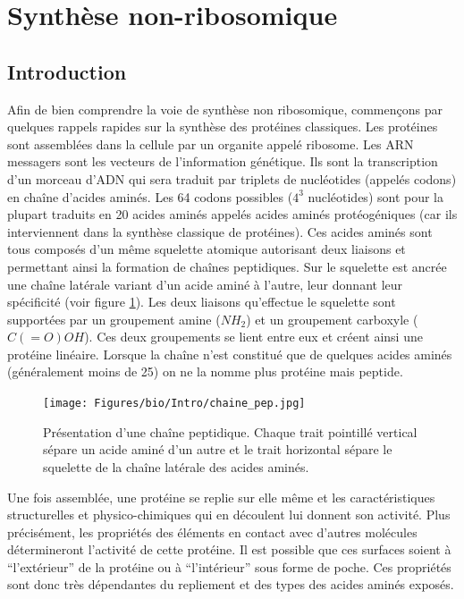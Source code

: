 \section{Synthèse non-ribosomique}
\label{bio_NRP}

\subsection{Introduction}
\label{intro_bio}

Afin de bien comprendre la voie de synthèse non ribosomique, commençons par quelques rappels rapides sur la synthèse des protéines classiques.
Les protéines sont assemblées dans la cellule par un organite appelé ribosome.
Les ARN messagers sont les vecteurs de l'information génétique.
Ils sont la transcription d'un morceau d'ADN qui sera traduit par triplets de nucléotides (appelés codons) en chaîne d'acides aminés.
Les 64 codons possibles ($4^3$ nucléotides) sont pour la plupart traduits en 20 acides aminés appelés acides aminés protéogéniques (car ils interviennent dans la synthèse classique de protéines).
Ces acides aminés sont tous composés d'un même squelette atomique autorisant deux liaisons et permettant ainsi la formation de chaînes peptidiques.
Sur le squelette est ancrée une chaîne latérale variant d'un acide aminé à l'autre, leur donnant leur spécificité (voir figure \ref{chaine_pep}).
Les deux liaisons qu'effectue le squelette sont supportées par un groupement amine ($NH_2$) et un groupement carboxyle ($C(=O)OH$).
Ces deux groupements se lient entre eux et créent ainsi une protéine linéaire.
Lorsque la chaîne n'est constitué que de quelques acides aminés (généralement moins de 25) on ne la nomme plus protéine mais peptide.

\begin{figure}[h!]
  \begin{center}
    \texttt{[image: Figures/bio/Intro/chaine\_pep.jpg]}
    \caption{\label{chaine_pep}Présentation d'une chaîne peptidique.
    Chaque trait pointillé vertical sépare un acide aminé d'un autre et le trait horizontal sépare le squelette de la chaîne latérale des acides aminés.}
  \end{center}
\end{figure}

Une fois assemblée, une protéine se replie sur elle même et les caractéristiques structurelles et physico-chimiques qui en découlent lui donnent son activité.
Plus précisément, les propriétés des éléments en contact avec d'autres molécules détermineront l'activité de cette protéine.
Il est possible que ces surfaces soient à ``l'extérieur'' de la protéine ou à ``l'intérieur'' sous forme de poche.
Ces propriétés sont donc très dépendantes du repliement et des types des acides aminés exposés.



